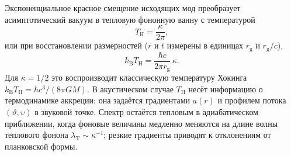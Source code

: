 \documentclass[12pt,a4paper,preprint]{elsarticle}
\begin{document}
            Экспоненциальное красное смещение исходящих мод преобразует асимптотический вакуум в тепловую фононную ванну с температурой
            \begin{equation}
                T_{\mathrm{H}} = \frac{\kappa}{2\pi} ,
                \label{eq:hawking-temperature}
            \end{equation}
            или при восстановлении размерностей ($r$ и $t$ измерены в единицах $r_{\mathrm{g}}$ и $r_{\mathrm{g}}/c$),
            \begin{equation}
                k_{\mathrm{B}}T_{\mathrm{H}} = \frac{\hbar c}{2\pi r_{\mathrm{g}}}\,\kappa .
                \label{eq:hawking-temperature-dim}
            \end{equation}
            Для $\kappa=1/2$ это воспроизводит классическую температуру Хокинга $k_{\mathrm{B}}T_{\mathrm{H}}=\hbar c^{3}/(8\pi GM)$. В акустическом случае $T_{\mathrm{H}}$ несёт информацию о термодинамике аккреции: она задаётся градиентами $a(r)$ и профилем потока $(\vartheta,\upsilon)$ в звуковой точке. Спектр остаётся тепловым в адиабатическом приближении, когда фоновые величины медленно меняются на длине волны теплового фонона $\lambda_{\mathrm{T}}\sim\kappa^{-1}$; резкие градиенты приводят к отклонениям от планковской формы.
\end{document}
